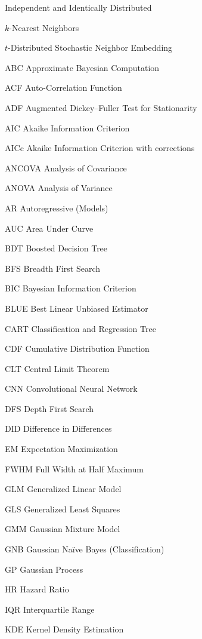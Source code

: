 \begin{symbollist}
  \item[\iid] Independent and Identically Distributed
  \item[\kNN] $k$-Nearest Neighbors
  \item[\tSNE] $t$-Distributed Stochastic Neighbor Embedding
  \item[ABC] Approximate Bayesian Computation
  \item[ACF] Auto-Correlation Function
  \item[ADF] Augmented Dickey--Fuller Test for Stationarity
  \item[AIC] Akaike Information Criterion
  \item[AICc] Akaike Information Criterion with corrections
  \item[ANCOVA] Analysis of Covariance
  \item[ANOVA] Analysis of Variance
  \item[AR] Autoregressive (Models)
  \item[AUC] Area Under Curve
  \item[BDT] Boosted Decision Tree
  \item[BFS] Breadth First Search
  \item[BIC] Bayesian Information Criterion
  \item[BLUE] Best Linear Unbiased Estimator
  \item[CART] Classification and Regression Tree
  \item[CDF] Cumulative Distribution Function
  \item[CLT] Central Limit Theorem
  \item[CNN] Convolutional Neural Network
  \item[DFS] Depth First Search
  \item[DID] Difference in Differences
  \item[EM] Expectation Maximization
  \item[FWHM] Full Width at Half Maximum
  \item[GLM] Generalized Linear Model
  \item[GLS] Generalized Least Squares
  \item[GMM] Gaussian Mixture Model
  \item[GNB] Gaussian N{a\"i}ve Bayes (Classification)
  \item[GP] Gaussian Process
  \item[HR] Hazard Ratio
  \item[IQR] Interquartile Range
  \item[KDE] Kernel Density Estimation

\end{symbollist}
